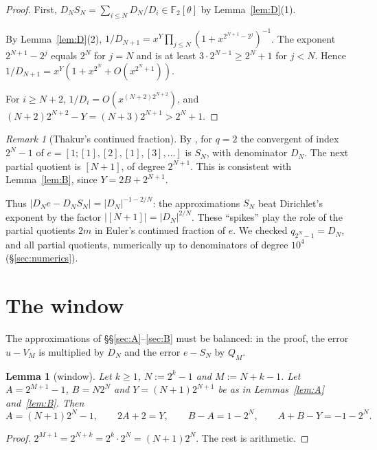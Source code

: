 \documentclass[11pt]{amsart}
\newtheorem{lemma}[theorem]{Lemma}
\theoremstyle{remark}
\newtheorem{remark}[theorem]{Remark}
\numberwithin{equation}{section}
\newcommand{\F}{\mathbb{F}}
\begin{document}
\begin{proof}
First, $D_NS_N=\sum_{i\le N}D_N/D_i\in\F_2[\theta]$ by Lemma~\ref{lem:D}(1).

By Lemma~\ref{lem:D}(2), $1/D_{N+1}=x^Y\prod_{j\le N}(1+x^{2^{N+1}-2^j})^{-1}$. The exponent $2^{N+1}-2^j$ equals $2^N$ for $j=N$ and is at least $3\cdot2^{N-1}\ge2^N+1$ for $j<N$. Hence $1/D_{N+1}=x^Y(1+x^{2^N}+O(x^{2^N+1}))$.

For $i\ge N+2$, $1/D_i=O(x^{(N+2)2^{N+2}})$, and $(N+2)2^{N+2}-Y=(N+3)2^{N+1}>2^N+1$.
\end{proof}

\begin{remark}[Thakur's continued fraction]\label{rem:thakur}
By \cite[Thm.~1 and its proof]{Tha92}, for $q=2$ the convergent of index $2^N-1$ of $e=[1;[1],[2],[1],[3],\dots]$ is $S_N$, with denominator $D_N$. The next partial quotient is $[N+1]$, of degree $2^{N+1}$. This is consistent with Lemma~\ref{lem:B}, since $Y=2B+2^{N+1}$.

Thus $|D_Ne-D_NS_N|=|D_N|^{-1-2/N}$: the approximations $S_N$ beat Dirichlet's exponent by the factor $|[N+1]|=|D_N|^{2/N}$. These ``spikes'' play the role of the partial quotients $2m$ in Euler's continued fraction of $e$. We checked $q_{2^N-1}=D_N$, and all partial quotients, numerically up to denominators of degree $10^4$ (\S\ref{sec:numerics}).
\end{remark}

\section{The window}\label{sec:window}

The approximations of \S\S\ref{sec:A}--\ref{sec:B} must be balanced: in the proof, the error $u-V_M$ is multiplied by $D_N$ and the error $e-S_N$ by $Q_M$.

\begin{lemma}[window]\label{lem:window}
Let $k\ge1$, $N:=2^k-1$ and $M:=N+k-1$. Let $A=2^{M+1}-1$, $B=N2^N$ and $Y=(N+1)2^{N+1}$ be as in Lemmas~\ref{lem:A} and~\ref{lem:B}. Then
\[
A=(N+1)2^N-1,\qquad 2A+2=Y,\qquad B-A=1-2^N,\qquad A+B-Y=-1-2^N .
\]
\end{lemma}

\begin{proof}
$2^{M+1}=2^{N+k}=2^k\cdot2^N=(N+1)2^N$. The rest is arithmetic.
\end{proof}
\end{document}
